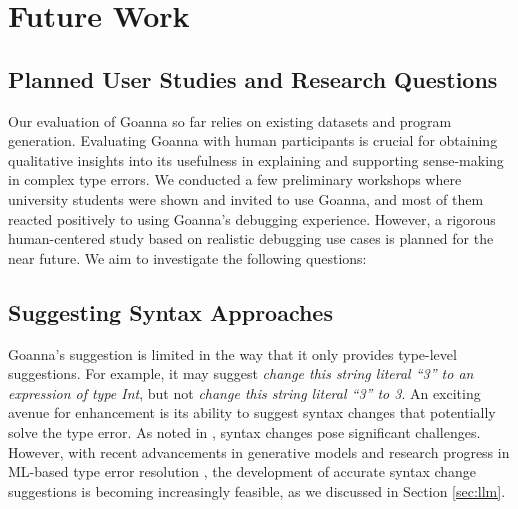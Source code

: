 \documentclass[pdflatex,lineno,sn-nature,Numbered]{sn-jnl}%
\begin{document}
\section{Future Work}\label{sec:future-work}

\subsection{Planned User Studies and Research Questions}

Our evaluation of Goanna so far relies on existing datasets and program generation. Evaluating Goanna with human participants is crucial for obtaining qualitative insights into its usefulness in explaining and supporting sense-making in complex type errors. We conducted a few preliminary workshops where university students were shown and invited to use Goanna, and most of them reacted positively to using Goanna's debugging experience. However, a rigorous human-centered study based on realistic debugging use cases is planned for the near future. We aim to investigate the following questions:


\subsection{Suggesting Syntax Approaches}

Goanna's suggestion is limited in the way that it only provides type-level suggestions. For example, it may suggest {\it change this string literal ``3'' to an expression of type Int}, but not {\it change this string literal ``3'' to 3}.  An exciting avenue for enhancement is its ability to suggest syntax changes that potentially solve the type error. As noted in \cite{Chen2014-dz}, syntax changes pose significant challenges. However, with recent advancements in generative models and research progress in ML-based type error resolution \cite{Seidel2017-uf}, the development of accurate syntax change suggestions is becoming increasingly feasible, as we discussed in Section \ref{sec:llm}.
\end{document}

